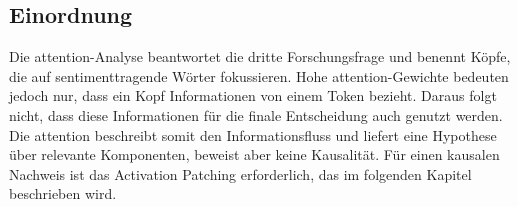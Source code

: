 \subsection{Einordnung}

Die \gls{attention}-Analyse beantwortet die dritte Forschungsfrage und benennt Köpfe, die auf sentimenttragende Wörter fokussieren. Hohe \gls{attention}-Gewichte bedeuten jedoch nur, dass ein Kopf Informationen von einem Token bezieht. Daraus folgt nicht, dass diese Informationen für die finale Entscheidung auch genutzt werden. Die \gls{attention} beschreibt somit den Informationsfluss und liefert eine Hypothese über relevante Komponenten, beweist aber keine Kausalität. Für einen kausalen Nachweis ist das Activation Patching erforderlich, das im folgenden Kapitel beschrieben wird.
